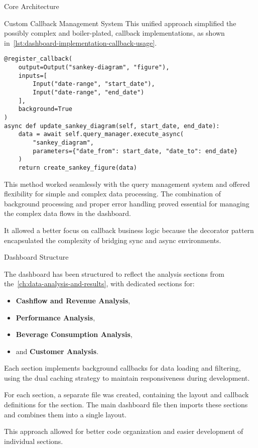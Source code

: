\begin{section}{Core Architecture}
\begin{subsection}{Custom Callback Management System}
		This unified approach simplified the possibly complex and boiler-plated, callback implementations, as shown in~\autoref{lst:dashboard-implementation-callback-usage}.

		\begin{listing}[H]
			\caption{Callback Registration Example}
			\begin{verbatim}
@register_callback(
    output=Output("sankey-diagram", "figure"),
    inputs=[
        Input("date-range", "start_date"),
        Input("date-range", "end_date")
    ],
    background=True
)
async def update_sankey_diagram(self, start_date, end_date):
    data = await self.query_manager.execute_async(
        "sankey_diagram",
        parameters={"date_from": start_date, "date_to": end_date}
    )
    return create_sankey_figure(data)
			\end{verbatim}
			\label{lst:dashboard-implementation-callback-usage}
		\end{listing}

		This method worked seamlessly with the query management system and offered flexibility for simple and complex data processing.
		The combination of background processing and proper error handling proved essential for managing the complex data flows in the dashboard.

		It allowed a better focus on callback business logic because the decorator pattern encapsulated the complexity of bridging sync and async environments.
	\end{subsection}

	\begin{subsection}{Dashboard Structure}
		\label{subsec:implementation-core-architecture-structure}

		The dashboard has been structured to reflect the analysis sections from the~\autoref{ch:data-analysis-and-results}, with dedicated sections for:
		\begin{itemize}
			\item \textbf{Cashflow and Revenue Analysis},
			\item \textbf{Performance Analysis},
			\item \textbf{Beverage Consumption Analysis},
			\item and \textbf{Customer Analysis}.
		\end{itemize}

		Each section implements background callbacks for data loading and filtering, using the dual caching strategy to maintain responsiveness during development.

		For each section, a separate file was created, containing the layout and callback definitions for the section.
		The main dashboard file then imports these sections and combines them into a single layout.

		This approach allowed for better code organization and easier development of individual sections.
	\end{subsection}
\end{section}

